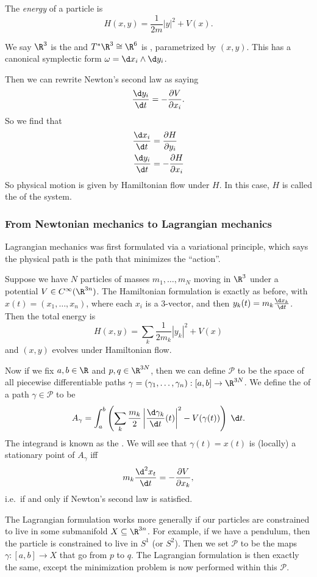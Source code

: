 \documentclass[a4paper]{article}
\begin{document}
\begin{defi}[Energy]
  The \emph{energy} of a particle is
  \[
    H(x, y) = \frac{1}{2m} |y|^2 + V(x).
  \]
\end{defi}
We say $\R^3$ is the  and $T^* \R^3 \cong \R^6$ is , parametrized by $(x, y)$. This has a canonical symplectic form $\omega = \d x_i \wedge \d y_i$.

Then we can rewrite Newton's second law as saying
\[
  \frac{\d y_i}{\d t} = - \frac{\partial V}{\partial x_i}.
\]
So we find that
\begin{align*}
  \frac{\d x_i}{\d t} &= \frac{\partial H}{\partial y_i}\\
  \frac{\d y_i}{\d t} &= -\frac{\partial H}{\partial x_i}
\end{align*}
So physical motion is given by Hamiltonian flow under $H$. In this case, $H$ is called the  of the system.

\subsubsection*{From Newtonian mechanics to Lagrangian mechanics}
Lagrangian mechanics was first formulated via a variational principle, which says the physical path is the path that minimizes the ``action''.
\begin{eg}
  Suppose we have $N$ particles of masses $m_1, \ldots, m_N$ moving in $\R^3$ under a potential $V \in C^\infty(\R^{3n})$. The Hamiltonian formulation is exactly as before, with $x(t) = (x_1, \ldots, x_n)$, where each $x_i$ is a $3$-vector, and then $y_k(t) = m_k \frac{\d x_k}{\d t}$. Then the total energy is
  \[
    H(x, y) = \sum_k \frac{1}{2m_k} |y_k|^2 + V(x)
  \]
  and $(x, y)$ evolves under Hamiltonian flow.

  Now if we fix $a, b \in \R$ and $p, q \in \R^{3N}$, then we can define $\mathcal{P}$ to be the space of all piecewise differentiable paths $\gamma = (\gamma_1, \ldots, \gamma_n): [a, b] \to \R^{3N}$. We define the  of a path $\gamma \in \mathcal{P}$ to be
  \[
    A_\gamma = \int_a^b \left(\sum_k \frac{m_k}{2} \left|\frac{\d \gamma_k}{\d t}(t) \right|^2 - V(\gamma(t))\right)\;\d t.
  \]
  The integrand is known as the . We will see that $\gamma(t) = x(t)$ is (locally) a stationary point of $A_\gamma$ iff
  \[
    m_k \frac{\d^2 x_t}{\d t} = - \frac{\partial V}{\partial x_k},
  \]
  i.e.\ if and only if Newton's second law is satisfied.
\end{eg}
The Lagrangian formulation works more generally if our particles are constrained to live in some submanifold $X \subseteq \R^{3n}$. For example, if we have a pendulum, then the particle is constrained to live in $S^1$ (or $S^2$). Then we set $\mathcal{P}$ to be the maps $\gamma: [a, b] \to X$ that go from $p$ to $q$. The Lagrangian formulation is then exactly the same, except the minimization problem is now performed within this $\mathcal{P}$.
\end{document}

